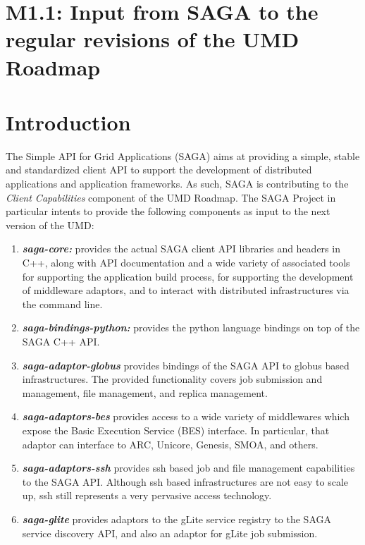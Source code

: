 \documentclass[10pt]{article}
\newcommand{\I}[1]{\textit{#1}}
\newcommand{\B}[1]{\textbf{#1}}
\newcommand{\BI}[1]{\B{\I{#1}}}
\begin{document}
 \section*{M1.1: Input from SAGA to the regular revisions of the UMD Roadmap}

 \section*{Introduction}

  The Simple API for Grid Applications (SAGA) aims at providing a
  simple, stable and standardized client API to support the
  development of distributed applications and application frameworks.
  As such, SAGA is contributing to the \I{Client Capabilities}
  component of the UMD Roadmap.  The SAGA Project in particular
  intents to provide the following components as input to the next
  version of the UMD:

  \begin{enumerate}

   \item \BI{saga-core:} provides the actual
   SAGA client API libraries and headers in C++, along with API
   documentation and a wide variety of associated tools for supporting
   the application build process, for supporting the development of
   middleware adaptors, and to interact with distributed
   infrastructures via the command line.

   \item \BI{saga-bindings-python:} provides the python language
   bindings on top of the SAGA C++ API.

   \item \BI{saga-adaptor-globus} provides bindings of the SAGA API to
   globus based infrastructures.  The provided functionality covers
   job submission and management, file management, and replica
   management.

   \item \BI{saga-adaptors-bes} provides access to a wide variety of
   middlewares which expose the Basic Execution Service (BES)
   interface.  In particular, that adaptor can interface to ARC,
   Unicore, Genesis, SMOA, and others.

   \item \BI{saga-adaptors-ssh} provides ssh based job and file
   management capabilities to the SAGA API.  Although ssh based
   infrastructures are not easy to scale up, ssh still represents a
   very pervasive access technology.

   \item \BI{saga-glite} provides adaptors to the gLite service
   registry to the SAGA service discovery API, and also an adaptor for
   gLite job submission.

  \end{enumerate}
\end{document}
